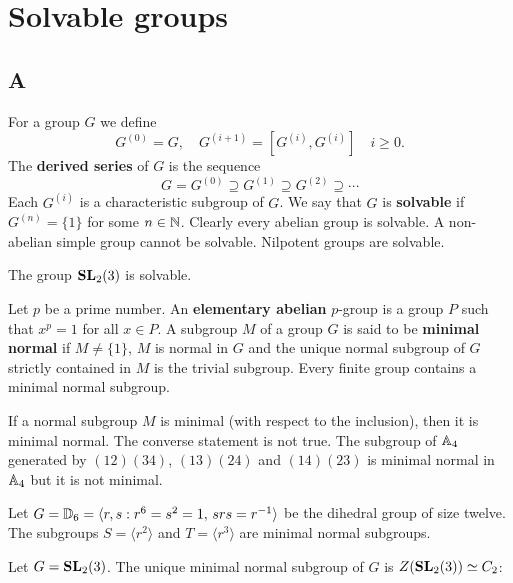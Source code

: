 \chapter{Solvable groups}

\section*{A}

For a group $G$ we define 
\[
		G^{(0)}=G,\quad
		G^{(i+1)}=[G^{(i)},G^{(i)}]\quad i\geq0.
\]
The \textbf{derived series} of $G$ is the sequence 
\[
G=G^{(0)}\supseteq G^{(1)}\supseteq G^{(2)}\supseteq\cdots
\]
Each $G^{(i)}$ is a characteristic subgroup of $G$. We say that 
$G$ is \textbf{solvable} if $G^{(n)}=\{1\}$ for some $n\in\mathbb{N}$. Clearly every abelian group
is solvable. A non-abelian simple group cannot be solvable. Nilpotent groups
are solvable.

\begin{exercise}
	The group $\mathbf{SL}_2(3)$ is solvable. 
\end{exercise}

Let $p$ be a prime number. An \textbf{elementary abelian} $p$-group is a group 
$P$ such that $x^p=1$ for all $x\in P$.
A subgroup $M$ of a group $G$ is said to be \textbf{minimal normal} if $M\ne\{1\}$,
$M$ is normal in $G$ and the unique normal subgroup of $G$ strictly contained in $M$ is
the trivial subgroup. Every finite group contains a minimal normal subgroup.  

\begin{example}
	If a normal subgroup $M$ is minimal (with respect to the inclusion), then it is
	minimal normal. The converse statement is not true. The subgroup of 
	$\mathbb{A}_4$ generated by $(12)(34)$, $(13)(24)$ and $(14)(23)$ is minimal normal in 
	$\mathbb{A}_4$ but it is not minimal. 
\end{example}

\begin{example}
	Let $G=\mathbb{D}_{6}=\langle r,s:r^6=s^2=1,\,srs=r^{-1}\rangle$ be the dihedral group
	of size twelve. The subgroups $S=\langle r^2\rangle$ 
	and $T=\langle r^3\rangle$ are minimal normal subgroups.  
\end{example}

\begin{exercise}
	Let $G=\mathbf{SL}_2(3)$. The unique minimal normal subgroup of $G$ is
	$Z(\mathbf{SL}_2(3))\simeq C_2$:
\end{exercise}

